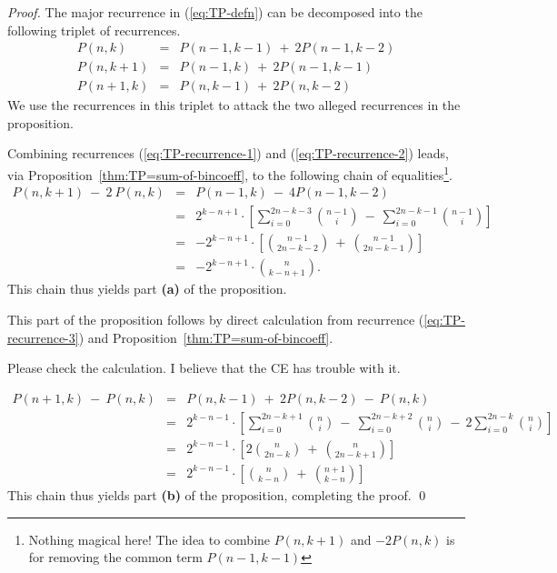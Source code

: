 \begin{proof}
The major recurrence in (\ref{eq:TP-defn}) can be decomposed into the following triplet of recurrences.
\begin{eqnarray}
\label{eq:TP-recurrence-1}
P(n, k)   & = & P(n-1, k-1) \ + \ 2 P(n-1, k-2) \\
\label{eq:TP-recurrence-2}
P(n, k+1) & = & P(n-1, k) \ + \ 2 P(n-1, k-1) \\
\label{eq:TP-recurrence-3}
P(n+1, k) & = & P(n, k-1) \ + \ 2 P(n, k-2)
\end{eqnarray}
We use the recurrences in this triplet to attack the two alleged recurrences in the proposition.

\medskip

Combining recurrences (\ref{eq:TP-recurrence-1}) and (\ref{eq:TP-recurrence-2}) leads, via
Proposition~\ref{thm:TP=sum-of-bincoeff}, to the following chain of equalities\footnote{Nothing magical here! The idea to combine $P(n, k+1)$ and $-2 P(n, k)$ is for removing the common term $P(n-1, k-1)$}.
\begin{eqnarray*}
P(n, k+1) \ - \ 2 \ P(n, k)
  & = &
P(n-1, k) \ - \ 4 P(n-1, k-2) \\
  & = &
2^{k-n+1} \cdot \left[
\sum_{i=0}^{2n-k-3} {{n-1} \choose i} \ - \
\sum_{i=0}^{2n-k-1} {{n-1} \choose i}
\right] \\
  & = & 
- 2^{k-n+1} \cdot \left[
{{n-1} \choose {2n-k-2}} \ + \ {{n-1} \choose {2n-k-1}}
\right] \\
  & = &
- 2^{k-n+1} \cdot {n \choose k-n+1}.
\end{eqnarray*}
This chain thus yields part {\bf (a)} of the proposition.

\bigskip

This part of the proposition follows by direct calculation from recurrence (\ref{eq:TP-recurrence-3}) and Proposition~\ref{thm:TP=sum-of-bincoeff}.

{\Arny Please check the calculation.  I believe that the CE has trouble with it.}


\begin{eqnarray*}
P(n+1, k) \ - \ P(n, k)
  & = &
P(n, k-1) \ + \ 2 P(n, k-2) \ - \ P(n,k) \\
  & = &
2^{k-n-1} \cdot \left[
\sum_{i=0}^{2n-k+1} {n \choose i}
 \ - \ \sum_{i=0}^{2n-k+2} {n \choose i}
 \ - \ 2 \sum_{i=0}^{2n-k} {n \choose i}
\right] \\
  & = & 
2^{k-n-1} \cdot \left[
  2 {n \choose {2n-k}} \ + \ {n \choose {2n-k+1}} \right] \\
  & = &
2^{k-n-1} \cdot \left[
   {n \choose {k-n}} \ + \ {{n+1} \choose {k-n}} \right]
\end{eqnarray*}
This chain thus yields part {\bf (b)} of the proposition, completing the proof.  \qed
\end{proof}

